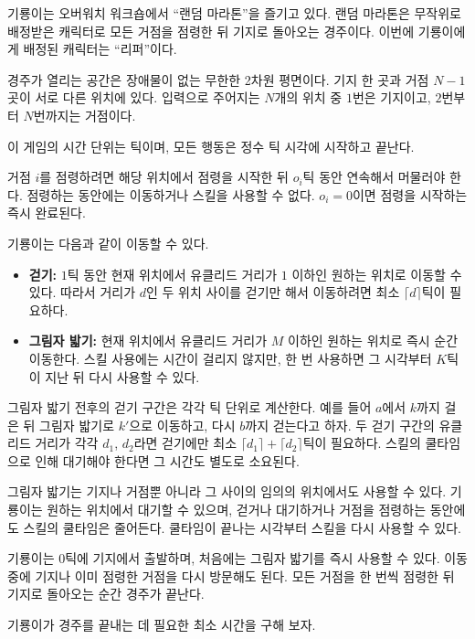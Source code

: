 기룡이는 오버워치 워크숍에서 ``랜덤 마라톤''을 즐기고 있다. 
랜덤 마라톤은 무작위로 배정받은 캐릭터로 모든 거점을 점령한 뒤 기지로 돌아오는 경주이다. 
이번에 기룡이에게 배정된 캐릭터는 ``리퍼''이다.

경주가 열리는 공간은 장애물이 없는 무한한 2차원 평면이다. 
기지 한 곳과 거점 $N-1$곳이 서로 다른 위치에 있다. 
입력으로 주어지는 $N$개의 위치 중 $1$번은 기지이고, 
$2$번부터 $N$번까지는 거점이다.

이 게임의 시간 단위는 틱이며, 모든 행동은 정수 틱 시각에 시작하고 끝난다.

거점 $i$를 점령하려면 해당 위치에서 점령을 시작한 뒤 $o_i$틱 동안 연속해서 머물러야 한다. 
점령하는 동안에는 이동하거나 스킬을 사용할 수 없다.
$o_i=0$이면 점령을 시작하는 즉시 완료된다. 

기룡이는 다음과 같이 이동할 수 있다.
\begin{itemize}
\item \textbf{걷기:} $1$틱 동안 현재 위치에서 유클리드 거리가 $1$ 이하인 원하는 위치로 이동할 수 있다. 따라서 거리가 $d$인 두 위치 사이를 걷기만 해서 이동하려면 최소 $\lceil d\rceil$틱이 필요하다.
\item \textbf{그림자 밟기:} 현재 위치에서 유클리드 거리가 $M$ 이하인 원하는 위치로 즉시 순간 이동한다. 스킬 사용에는 시간이 걸리지 않지만, 한 번 사용하면 그 시각부터 $K$틱이 지난 뒤 다시 사용할 수 있다.
\end{itemize}

그림자 밟기 전후의 걷기 구간은 각각 틱 단위로 계산한다. 예를 들어 $a$에서 $k$까지 걸은 뒤 그림자 밟기로 $k'$으로 이동하고, 다시 $b$까지 걷는다고 하자. 두 걷기 구간의 유클리드 거리가 각각 $d_1$, $d_2$라면 걷기에만 최소 $\lceil d_1\rceil+\lceil d_2\rceil$틱이 필요하다. 스킬의 쿨타임으로 인해 대기해야 한다면 그 시간도 별도로 소요된다.

그림자 밟기는 기지나 거점뿐 아니라 그 사이의 임의의 위치에서도 사용할 수 있다. 기룡이는 원하는 위치에서 대기할 수 있으며, 걷거나 대기하거나 거점을 점령하는 동안에도 스킬의 쿨타임은 줄어든다. 쿨타임이 끝나는 시각부터 스킬을 다시 사용할 수 있다.

기룡이는 $0$틱에 기지에서 출발하며, 처음에는 그림자 밟기를 즉시 사용할 수 있다. 이동 중에 기지나 이미 점령한 거점을 다시 방문해도 된다. 모든 거점을 한 번씩 점령한 뒤 기지로 돌아오는 순간 경주가 끝난다.

기룡이가 경주를 끝내는 데 필요한 최소 시간을 구해 보자.
